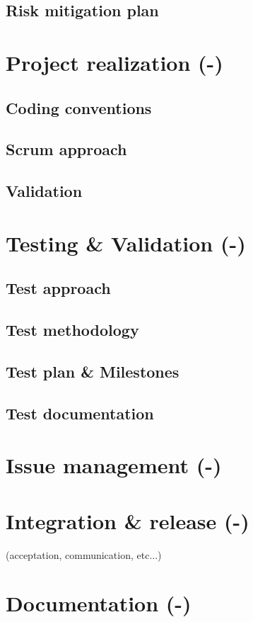 \documentclass[a4paper,12pt,abstracton,titlepage]{scrartcl}
\begin{document}
\subsection{Risk mitigation plan}

\section{Project realization (-)}
\subsection{Coding conventions}
\subsection{Scrum approach}
\subsection{Validation}

\section{Testing \& Validation (-)}
\subsection{Test approach}
\subsection{Test methodology}
\subsection{Test plan \& Milestones}
\subsection{Test documentation}

\section{Issue management (-)}

\section{Integration \& release (-)}
(acceptation, communication, etc...)

\section{Documentation (-)}
\end{document}

